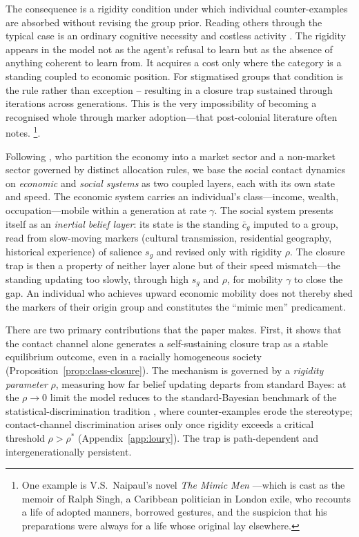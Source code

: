 \documentclass[pdflatex,sn-basic]{sn-jnl}
\theoremstyle{thmstyleone}
\numberwithin{proposition}{subsection}
\begin{document}
The consequence is a rigidity condition under which individual counter-examples are absorbed without revising the group prior. Reading others through the typical case is an ordinary cognitive necessity and costless activity \citep{Allport1954}. The rigidity appears in the model not as the agent's refusal to learn but as the absence of anything coherent to learn from. It acquires a cost only where the category is a standing coupled to economic position. For stigmatised groups that condition is the rule rather than exception -- resulting in a closure trap sustained through iterations across generations. This is the very impossibility of becoming a recognised whole through marker adoption---that post-colonial literature often notes. \footnote{One example is V.S.\ Naipaul's novel \emph{The Mimic Men} \citep{Naipaul1967}---which is cast as the memoir of Ralph Singh, a Caribbean politician in London exile, who recounts a life of adopted manners, borrowed gestures, and the suspicion that his preparations were always for a life whose original lay elsewhere.}. 

Following \citet{ColeMailathPostlewaite1992}, who partition the economy into a market sector and a non-market sector governed by distinct allocation rules, we base the social contact dynamics on \emph{economic} and \emph{social systems} as two coupled layers, each with its own state and speed. The economic system carries an individual's class---income, wealth, occupation---mobile within a generation at rate $\gamma$. The social system presents itself as an \emph{inertial belief layer}: its state is the standing $\bar{c}_g$ imputed to a group, read from slow-moving markers (cultural transmission, residential geography, historical experience) of salience $s_g$ and revised only with rigidity $\rho$. The closure trap is then a property of neither layer alone but of their speed mismatch---the standing updating too slowly, through high $s_g$ and $\rho$, for mobility $\gamma$ to close the gap. An individual who achieves upward economic mobility
does not thereby shed the markers of their origin group and constitutes the ``mimic men'' predicament.

There are two primary contributions that the paper makes. First, it shows that the
contact channel alone generates a self-sustaining closure trap as
a stable equilibrium outcome, even in a racially homogeneous
society (Proposition~\ref{prop:class-closure}). The mechanism is
governed by a \emph{rigidity parameter} $\rho$, measuring how far
belief updating departs from standard Bayes: at the $\rho \to 0$
limit the model reduces to the standard-Bayesian benchmark of the
statistical-discrimination tradition
\citep{Phelps1972,Arrow1973}, where counter-examples erode the
stereotype; contact-channel discrimination arises only once
rigidity exceeds a critical threshold $\rho > \rho^*$
(Appendix~\ref{app:loury}). The trap is path-dependent and intergenerationally persistent. 
\end{document}
